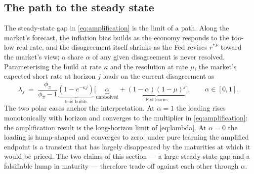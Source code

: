 \documentclass[11pt]{article}
\begin{document}
\subsection{The path to the steady state}
\label{sec:path}
The steady-state gap in \eqref{eq:amplification} is the limit of a path. Along the market's
forecast, the inflation bias builds as the economy responds to the too-low real rate, and the
disagreement itself shrinks as the Fed revises $r^{*F}$ toward the market's view; a share
$\alpha$ of any given disagreement is never resolved. Parameterising the build at rate $\kappa$
and the resolution at rate $\mu$, the market's expected short rate at horizon $j$ loads on the
current disagreement as
\begin{equation}
\lambda_j \;=\; \frac{\phi_\pi}{\phi_\pi-1}\underbrace{\left(1-e^{-\kappa j}\right)}_{\text{bias builds}}
\Big[\underbrace{\alpha}_{\text{unresolved}} + \underbrace{(1-\alpha)(1-\mu)^{j}}_{\text{Fed learns}}\Big],
\qquad \alpha\in[0,1].
\label{eq:lambda}
\end{equation}
The two polar cases anchor the interpretation. At $\alpha=1$ the loading rises monotonically
with horizon and converges to the multiplier in \eqref{eq:amplification}: the amplification
result is the long-horizon limit of \eqref{eq:lambda}. At $\alpha=0$ the loading is
hump-shaped and converges to zero: under pure learning the amplified endpoint is a transient
that has largely disappeared by the maturities at which it would be priced. The two claims of
this section --- a large steady-state gap and a falsifiable hump in maturity --- therefore trade
off against each other through $\alpha$.
\end{document}
